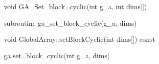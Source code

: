 \documentclass[10pt]{article}
\begin{document}
\begin{capi}
\begin{ccode}
void GA_Set_block_cyclic(int g_a, int dims[])
\end{ccode}
\begin{funcargs}
\end{funcargs}
\end{capi}

\begin{fapi}
\begin{fcode}
subroutine ga_set_block_cyclic(g_a, dims)
\end{fcode}
\begin{funcargs}
\end{funcargs}
\end{fapi}

\begin{cxxapi}
\begin{cxxcode}
void GlobalArray::setBlockCyclic(int dims[]) const
\end{cxxcode}
\begin{funcargs}
\end{funcargs}
\end{cxxapi}

\begin{pyapi}
\begin{pycode}
ga.set_block_cyclic(int g_a, dims)
\end{pycode}
\begin{funcargs}
\end{funcargs}
\end{pyapi}

\gcoll
\end{document}
